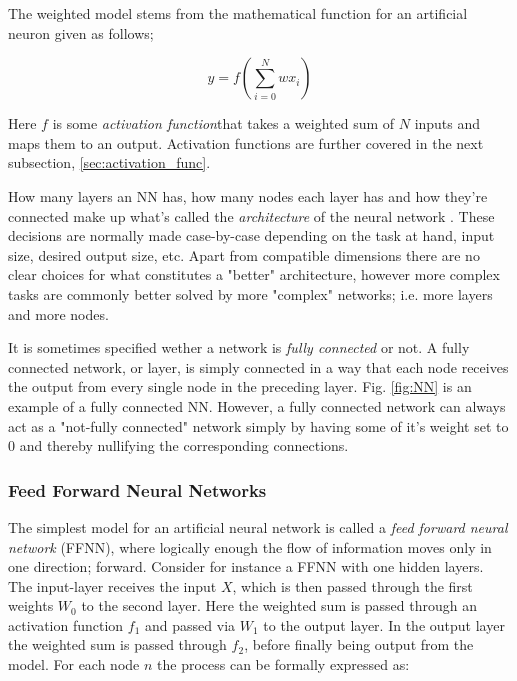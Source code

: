 The weighted model stems from the mathematical function for an artificial neuron given as follows; 

\begin{equation}\label{artifical_neuron}
    y = f\left( \sum_{i=0}^Nwx_i \right) 
\end{equation}

Here $f$ is some \textit{activation function}that takes a weighted sum of $N$ inputs and maps them to an output. Activation functions are further covered in the next subsection, \ref{sec:activation_func}.

How many layers an NN has, how many nodes each layer has and how they're connected make up what's called the \textit{architecture} of the neural network \citep[Ch.1]{nielsen}. These decisions are normally made case-by-case depending on the task at hand, input size, desired output size, etc. Apart from compatible dimensions there are no clear choices for what constitutes a "better" architecture, however more complex tasks are commonly better solved by more "complex" networks; i.e. more layers and more nodes. 


It is sometimes specified wether a network is \textit{fully connected} or not. A fully connected network, or layer, is simply connected in a way that each node receives the output from every single node in the preceding layer. Fig. \ref{fig:NN} is an example of a fully connected NN. However, a fully connected network can always act as a "not-fully connected" network simply by having some of it's weight set to $0$ and thereby nullifying the corresponding connections. 

\subsubsection{Feed Forward Neural Networks}\label{sec:nn}
The simplest model for an artificial neural network is called a \textit{feed forward neural network} (FFNN), where logically enough the flow of information moves only in one direction; forward. Consider for instance a FFNN with one hidden layers. The input-layer receives the input $X$, which is then passed through the first weights $W_0$ to the second layer. Here the weighted sum is passed through an activation function $f_1$ and passed via $W_1$ to the output layer. In the output layer the weighted sum is passed through $f_2$, before finally being output from the model. 
For each node $n$ the process can be formally expressed as:


